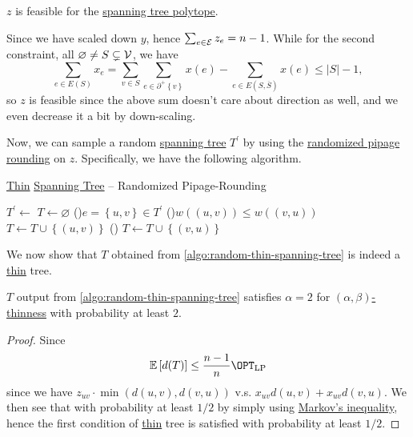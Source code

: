 \begin{remark}
	\(z\) is feasible for the \hyperref[eq:lec10-1]{spanning tree polytope}.
\end{remark}
\begin{explanation}
	Since we have scaled down \(y\), hence \(\sum_{e\in \mathcal{\MakeUppercase{e}} } z_e = n-1\). While for the second constraint, all \(\varnothing \neq S \subsetneq \mathcal{\MakeUppercase{v}} \), we have
	\[
		\sum_{e\in E(S)} x_e = \sum_{v\in S} \sum_{e\in \partial ^+ \left\{ v \right\} } x(e) - \sum_{e\in E(S, \overline{S} )} x(e) \leq \left\vert S \right\vert - 1,
	\]
	so \(z\) is feasible since the above sum doesn't care about direction as well, and we even decrease it a bit by down-scaling.
\end{explanation}

Now, we can sample a random \hyperref[def:spanning-tree]{spanning tree} \(T^\prime \) by using the \hyperref[algo:min-spanning-tree-randomized-pipage-rounding]{randomized pipage rounding} on \(z\). Specifically, we have the following algorithm.

\begin{algorithm}[H]\label{algo:random-thin-spanning-tree}
	\DontPrintSemicolon
	\caption{\hyperref[def:thin]{Thin} \hyperref[def:spanning-tree]{Spanning Tree} -- Randomized Pipage-Rounding}
	\BlankLine
	\(T^\prime \gets\)\;
	\(T\gets \varnothing \)\;
	\For(){\(e=\left\{ u, v \right\} \in T^\prime \)}{
		\uIf(){\(w((u, v)) \leq w((v, u))\)}{
			\(T\gets T \cup \left\{ (u, v) \right\} \)\;
		}
		\Else(){
			\(T\gets T \cup \left\{ (v, u) \right\} \)\;
		}
	}
	\;
\end{algorithm}

We now show that \(T\) obtained from \autoref{algo:random-thin-spanning-tree} is indeed a \hyperref[def:thin]{thin} tree.

\begin{lemma}\label{lma:lec12-1}
	\(T\) output from \autoref{algo:random-thin-spanning-tree} satisfies \(\alpha =2\) for \hyperref[def:thin]{\((\alpha , \beta )\)-thinness} with probability at least \(2\).
\end{lemma}
\begin{proof}
	Since
	\[
		\mathbb{E}\left[d(T) \right] \leq \frac{n-1}{n}\OPT_{\mathrm{LP} }
	\]
	since we have \(z_{uv}\cdot \min (d(u, v), d(v, u))\) v.s. \(x_{uv} d(u, v) + x_{uv} d(v, u)\). We then see that with probability at least \(1 / 2\) by simply using \href{https://en.wikipedia.org/wiki/Markov%27s_inequality}{Markov's inequality}, hence the first condition of \hyperref[def:thin]{thin} tree is satisfied with probability at least \(1 / 2\).
\end{proof}

